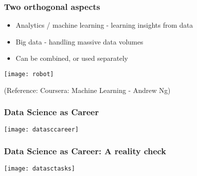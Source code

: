 \begin{frame}[fragile]\frametitle{Two orthogonal aspects}
	\begin{itemize}
	\item  Analytics / machine learning - learning insights from data
	\item  Big data - handling massive data volumes
	\item Can be combined, or used separately
	\end{itemize}
\begin{center}
\texttt{[image: robot]}
\end{center}	
\tiny{(Reference: Coursera: Machine Learning - Andrew Ng)}

\end{frame}



\begin{frame}[fragile]\frametitle{Data Science as Career}
\begin{center}
\texttt{[image: datasccareer]}
\end{center}
\end{frame}

\begin{frame}[fragile]\frametitle{Data Science as Career: A reality check}
\begin{center}
\texttt{[image: datasctasks]}
\end{center}
\end{frame}


